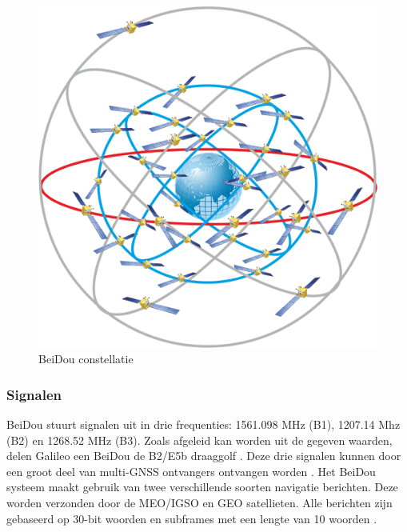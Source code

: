 \begin{figure}[hpb]
	\includegraphics[scale=0.5]{BeiDou.png}
	\caption{BeiDou constellatie \cite{LImgBeiDou}}
	\label{imgBeiDou}
\end{figure} 

\subsubsection{Signalen}
BeiDou stuurt signalen uit in drie frequenties: 1561.098 MHz (B1), 1207.14 Mhz (B2) en 1268.52 MHz (B3). Zoals afgeleid kan worden uit de gegeven waarden, delen Galileo een BeiDou de B2/E5b draaggolf \cite{LBibPPP2,LBibBeiDou4}. Deze drie signalen kunnen door een groot deel van multi-GNSS ontvangers ontvangen worden \cite{LBibGNSS9}. Het BeiDou systeem maakt gebruik van twee verschillende soorten navigatie berichten. Deze worden verzonden door de MEO/IGSO en GEO satellieten. Alle berichten zijn gebaseerd op 30-bit woorden en subframes met een lengte van 10 woorden \cite{LBibBeiDou5}.  

